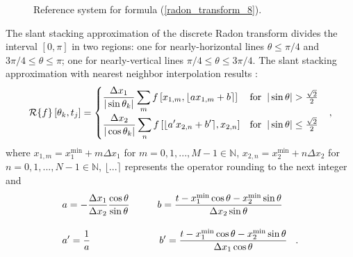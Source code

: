 {\begin{figure}[!h]
\begin{center}
  \end{center}
  \caption[Reference system.]{Reference system for formula (\ref{radon_transform_8}).}
  \label{introduction:radon-transform:reference-system}
\end{figure}
The slant stacking approximation of the discrete Radon transform divides the interval $[0,\pi]$
in two regions: one for nearly-horizontal lines $\theta \leq \pi/4$ and $3\pi/4 \leq \theta \leq \pi$;
one for nearly-vertical lines $\pi/4 \leq \theta \leq 3\pi/4$. The slant stacking 
approximation with nearest neighbor interpolation 
results \cite{Toft1996}:
\begin{equation}
    \operatorname{\mathcal{R}}\{f\}\left[\theta_{k},t_{j}\right] = \begin{cases}
                                                \displaystyle \frac{\Delta x_{1}}{|\sin\theta_{k}|} \sum\limits_{m}f\left[x_{1,m},\lfloor ax_{1,m}+b \rceil\right] 
                                                 & \text{for} \hspace{0.2cm}|\sin\theta| > \frac{\sqrt{2}}{2}\\[1em]
                                                \displaystyle \frac{\Delta x_{2}}{|\cos\theta_{k}|} \sum\limits_{n}f\left[\lfloor a'x_{2,n}+b'\rceil,x_{2,n}\right] 
                                                 & \text{for} \hspace{0.2cm}|\sin\theta| \leq \frac{\sqrt{2}}{2} 
                                               \end{cases}\hspace{0.3cm},
  \label{radon_transform_9}
\end{equation}
where $x_{1,m} = x_{1}^{\text{min}} + m\Delta x_{1}$ for $m = 0, 1, ..., M-1 \in \mathbb{N}$, 
$x_{2,n} = x_{2}^{\text{min}} + n\Delta x_{2}$ for $n = 0, 1, ..., N-1 \in \mathbb{N}$,
$\lfloor...\rceil$ represents the operator rounding to the next integer and
\begin{equation}
\begin{split}
  & a = -\frac{\Delta x_{1}}{\Delta x_{2}}\frac{\cos\theta}{\sin\theta} \hspace{1cm} b = \frac{t - x_{1}^{\text{min}}\cos\theta 
         - x_{2}^{\text{min}}\sin\theta}{\Delta x_{2}\sin\theta} \\[1em]
  & a' = \frac{1}{a} \hspace{2.5cm} b' = \frac{t - x_{1}^{\text{min}}\cos\theta 
         - x_{2}^{\text{min}}\sin\theta}{\Delta x_{1}\cos\theta} \hspace{0.3cm}.
  \label{radon_transform_10}       

\end{split}
\end{equation}}
